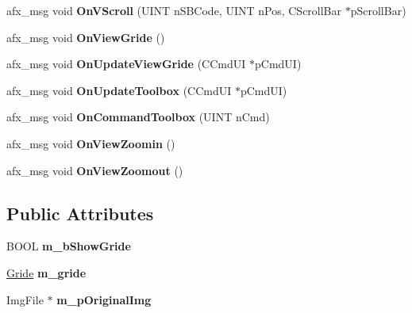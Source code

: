 \begin{DoxyCompactItemize}
\mbox{\label{class_process_view_a6cd442b45537d007e354f6d6bb59a778}} 
afx\+\_\+msg void {\bfseries On\+V\+Scroll} (U\+I\+NT n\+S\+B\+Code, U\+I\+NT n\+Pos, C\+Scroll\+Bar $\ast$p\+Scroll\+Bar)
\item 
\mbox{\label{class_process_view_a83b03b4d575bcb06ebf6bdd470c01942}} 
afx\+\_\+msg void {\bfseries On\+View\+Gride} ()
\item 
\mbox{\label{class_process_view_acbb45aa45b32a59abd0b9a2193d7183e}} 
afx\+\_\+msg void {\bfseries On\+Update\+View\+Gride} (C\+Cmd\+UI $\ast$p\+Cmd\+UI)
\item 
\mbox{\label{class_process_view_a543224f665b9e4a819e753851815fc3d}} 
afx\+\_\+msg void {\bfseries On\+Update\+Toolbox} (C\+Cmd\+UI $\ast$p\+Cmd\+UI)
\item 
\mbox{\label{class_process_view_aceb4f73ef0470ac2defa7240234ff8b2}} 
afx\+\_\+msg void {\bfseries On\+Command\+Toolbox} (U\+I\+NT n\+Cmd)
\item 
\mbox{\label{class_process_view_a20ed42b9ec53e1c8a06c4583569c71fc}} 
afx\+\_\+msg void {\bfseries On\+View\+Zoomin} ()
\item 
\mbox{\label{class_process_view_a20aa12d6a33b71fc6a303c8a1af95268}} 
afx\+\_\+msg void {\bfseries On\+View\+Zoomout} ()
\end{DoxyCompactItemize}
\subsection*{Public Attributes}
\begin{DoxyCompactItemize}
\item 
\mbox{\label{class_process_view_aeef37b8953cb3c432954240c91e98a5d}} 
B\+O\+OL {\bfseries m\+\_\+b\+Show\+Gride}
\item 
\mbox{\label{class_process_view_a7c7fc0bd7d0416172e7d00cf682f2bb5}} 
\mbox{\hyperlink{class_gride}{Gride}} {\bfseries m\+\_\+gride}
\item 
\mbox{\label{class_process_view_adc0115d468bba213de87ed1513fc673f}} 
Img\+File $\ast$ {\bfseries m\+\_\+p\+Original\+Img}
\end{DoxyCompactItemize}
